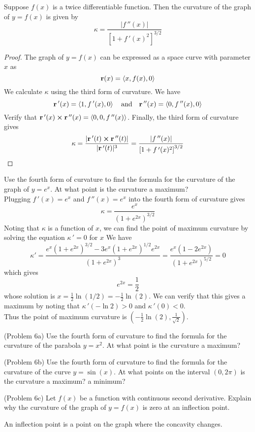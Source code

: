 \documentclass[handout]{ximera}
\begin{document}
\begin{proposition}
Suppose $f(x)$ is a twice differentiable function. Then the curvature of the graph of $y = f(x)$ is given by
\[
\kappa = \frac{|f\,''(x)|}{\left[1+ f\,'(x)^2\right]^{3/2}}
\]
\end{proposition}

\begin{proof}
The graph of $y = f(x)$ can be expressed as a space curve with parameter $x$ as
\[
\mathbf r(x) = \left\langle x, f(x), 0\right\rangle
\]
We calculate $\kappa$ using the third form of curvature. We have
\[
\mathbf r\,'(x) = \left\langle 1, f\,'(x), 0\right\rangle \quad \text{and} \quad \mathbf r\,''(x) = \left\langle 0, f\,''(x), 0\right\rangle 
\]
Verify that $\mathbf r\,'(x) \boldsymbol\times \mathbf r\,''(x) = \left\langle 0,0,f\,''(x)\right\rangle$.
Finally, the third form of curvature gives
\[
\kappa = \frac{|\mathbf r\,'(t) \boldsymbol\times \mathbf r\,''(t)|}{|\mathbf r\,'(t)|^3} = \frac{|f\,''(x)|}{\left[1+ f\,'(x)^2\right]^{3/2}}
\]
\end{proof}

\begin{example}[Example 6]
Use the fourth form of curvature to find the formula for the curvature of the graph of $y = e^x$.  At what point is the curvature a maximum?\\
Plugging $f\,'(x) = e^x$ and $f\,''(x) = e^x$ into the fourth form of curvature gives
\[
\kappa = \frac{e^x}{(1+e^{2x})^{3/2}}
\]
Noting that $\kappa$ is a function of $x$, we can find the point of maximum curvature by solving the equation $\kappa\,' = 0$ for $x$
We have
\[
\kappa ' = \frac{e^x(1+e^{2x})^{3/2} - 3e^x(1+e^{2x})^{1/2}e^{2x}}{(1+e^{2x})^3} = \frac{e^x\left(1- 2e^{2x}\right)}{(1+e^{2x})^{5/2}} = 0
\]
which gives
\[
 e^{2x} = \frac12
\]
whose solution is $ x = \frac12 \ln(1/2) = -\frac12 \ln(2)$. We can verify that this gives a maximum by 
noting that  $\kappa \,' (-\ln 2) > 0$ and   $\kappa \,' (0) < 0$. \\
Thus the point of maximum curvature is $\left(-\frac12 \ln(2), \frac{1}{\sqrt 2}\right)$.
\end{example}

\begin{problem}(Problem 6a)
Use the fourth form of curvature to find the formula for the curvature of the parabola $y = x^2$.  At what point is the curvature a maximum?\\
\end{problem}

\begin{problem}(Problem 6b)
Use the fourth form of curvature to find the formula for the curvature of the curve $y = \sin(x)$.  
At what points on the interval $(0, 2\pi)$ is the curvature a maximum? a minimum?\\
\end{problem}


\begin{problem}(Problem 6c)
Let $f(x)$ be a function with continuous second derivative. Explain why the curvature of the graph of $y = f(x)$ is zero at an inflection point.\\
\begin{hint}
An inflection point is a point on the graph where the concavity changes.
\end{hint}
\end{problem}
\end{document}
